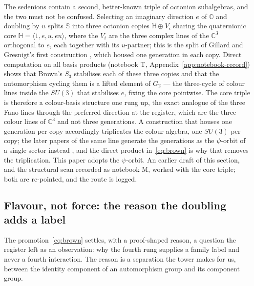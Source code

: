 \begin{remark}
\label{rem:two-triples}
The sedenions contain a second, better-known triple of octonion subalgebras, and the two must not
be confused. Selecting an imaginary direction $e$ of $\mathbb{O}$ and doubling by $u$ splits
$\mathbb{S}$ into three octonion copies $\mathbb{H}\oplus V_i$ sharing the quaternionic core
$\mathbb{H} = \langle 1, e, u, eu\rangle$, where the $V_i$ are the three complex lines of the
$\mathbb{C}^{3}$ orthogonal to $e$, each together with its $u$-partner; this is the split of Gillard
and Gresnigt's first construction \autocite{gillardgresnigt2019three}, which housed one generation
in each copy. Direct computation on all basis products (notebook T,
Appendix~\ref{app:notebook-record}) shows that Brown's $S_3$ stabilises each of these three copies
and that the automorphism cycling them is a lifted element of $G_2$ --- the three-cycle of colour
lines inside the $SU(3)$ that stabilises $e$, fixing the core pointwise. The core triple is
therefore a colour-basis structure one rung up, the exact analogue of the three Fano lines through
the preferred direction at the register, which are the three colour lines of $\mathbb{C}^{3}$ and
not three generations. A construction that houses one generation per copy accordingly triplicates
the colour algebra, one $SU(3)$ per copy; the later papers of the same line generate the
generations as the $\psi$-orbit of a single sector instead
\autocite{gresnigtgourlayvarma2023three,gresnigt2026three}, and the direct product
in~\eqref{eq:brown} is why that removes the triplication. This paper adopts the $\psi$-orbit. An
earlier draft of this section, and the structural scan recorded as notebook M, worked with the core
triple; both are re-pointed, and the route is logged.
\end{remark}

\subsection{Flavour, not force: the reason the doubling adds a label}
\label{sec:sedenions-flavour-not-force}

The promotion~\eqref{eq:brown} settles, with a proof-shaped reason, a question the register left as
an observation: why the fourth rung supplies a family label and never a fourth interaction. The
reason is a separation the tower makes for us, between the identity component of an automorphism
group and its component group.

